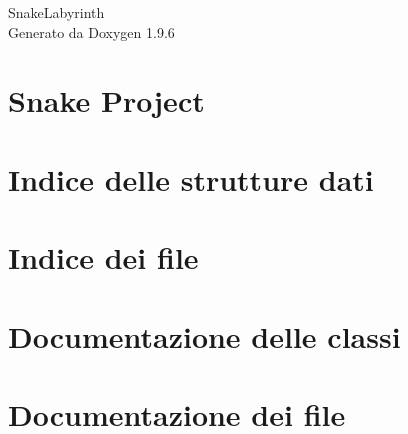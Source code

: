 \documentclass[twoside]{book}
\newcommand{\+}{\discretionary{\mbox{\scriptsize$\hookleftarrow$}}{}{}}
\newcommand{\clearemptydoublepage}{%
    \newpage{\pagestyle{empty}\cleardoublepage}%
  }
\begin{document}
  \raggedbottom
    \hypersetup{pageanchor=false,
                bookmarksnumbered=true,
                pdfencoding=unicode
               }
  \begin{titlepage}
  \vspace*{7cm}
  \begin{center}%
  {\Large Snake\+Labyrinth}\\
  \vspace*{1cm}
  {\large Generato da Doxygen 1.9.6}\\
  \end{center}
  \end{titlepage}
  \clearemptydoublepage
  \tableofcontents
  \clearemptydoublepage
  \hypersetup{pageanchor=true}
\chapter{Snake Project}
\label{index}\hypertarget{index}{}
\chapter{Indice delle strutture dati}

\chapter{Indice dei file}

\chapter{Documentazione delle classi}



\chapter{Documentazione dei file}







  \backmatter
  \newpage
  \clearemptydoublepage
  \printindex
\end{document}
